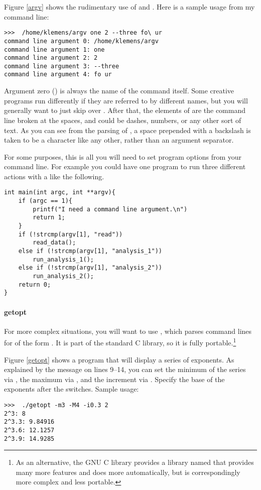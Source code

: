 
Figure \ref{argv} shows the rudimentary use of  and .
Here is a sample usage from my command line:
\begin{lstlisting}
>>>  /home/klemens/argv one 2 --three fo\ ur
command line argument 0: /home/klemens/argv
command line argument 1: one
command line argument 2: 2
command line argument 3: --three
command line argument 4: fo ur
\end{lstlisting}
Argument zero () is always the name of the command itself.
Some creative programs run differently if they are referred to by
different names, but you will generally want to just skip over .
After that, the elements of  are the command line broken at
the spaces, and could be dashes, numbers, or any other sort of text. As
you can see from the parsing of , a space prepended
with a backslash is taken to be a character like any other, rather than an
argument separator.

For some purposes, this is all you will need to set program options from your
command line. For example you could have one program to run three
different actions with a  like the following.
\begin{lstlisting}
int main(int argc, int **argv){
    if (argc == 1){
        printf("I need a command line argument.\n")
        return 1;
    }
    if (!strcmp(argv[1], "read"))
        read_data();
    else if (!strcmp(argv[1], "analysis_1"))
        run_analysis_1();
    else if (!strcmp(argv[1], "analysis_2"))
        run_analysis_2();
    return 0;
}
\end{lstlisting}

\lstset{numbers=left, numberstyle=\scshape}
\lstset{numbers=none}

\paragraph{getopt}
For more complex situations, you will want to use , which
parses command lines for  of the form .  It is
part of the standard C library, so it is fully portable.\footnote{As
an alternative, the GNU C library provides a library named 
that provides many more features and does more automatically, but is
correspondingly more complex and less portable.} 

Figure
\ref{getopt} shows a program that will display a series of exponents.
As explained by the message on lines 9--14, you can set the minimum of
the series via , the maximum via , and the increment via
. Specify the base of the exponents after the switches.
Sample usage:
\begin{lstlisting}
>>>  ./getopt -m3 -M4 -i0.3 2
2^3: 8
2^3.3: 9.84916
2^3.6: 12.1257
2^3.9: 14.9285
\end{lstlisting}

